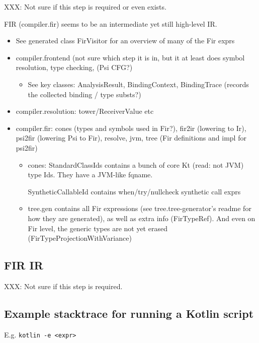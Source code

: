 \documentclass{article}
\begin{document}
XXX: Not sure if this step is required or even exists.

FIR (compiler.fir) seems to be an intermediate yet still high-level IR.

\begin{itemize}
    \item See generated class FirVisitor for an overview of many of the Fir exprs
    \item compiler.frontend (not sure which step it is in, but it at least does symbol resolution, type checking, (Psi \textSafeTo CFG?)
    \begin{itemize}
        \item See key classes: AnalysisResult, BindingContext, BindingTrace (records the collected binding / type substs?)
    \end{itemize}
    \item compiler.resolution: tower/ReceiverValue etc
    \item compiler.fir: cones (types and symbols used in Fir?), fir2ir (lowering to Ir), psi2fir (lowering Psi to Fir), resolve, jvm, tree (Fir definitions and impl for psi2fir)
    \begin{itemize}
        \item cones: StandardClassIds contains a bunch of core Kt (read: not JVM) type Ids. They have a JVM-like fqname.

        SyntheticCallableId contains when/try/nullcheck synthetic call exprs

        \item tree.gen contains all Fir expressions (see tree.tree-generator's readme for how they are generated), as well as extra info (FirTypeRef). And even on Fir level, the generic types are not yet erased (FirTypeProjectionWithVariance)
    \end{itemize}
\end{itemize}

\subsection{FIR \textSafeTo IR}

XXX: Not sure if this step is required.

\subsection{Example stacktrace for running a Kotlin script}

E.g. \texttt{kotlin -e <expr>}
\end{document}
